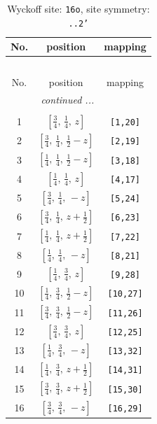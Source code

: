 \documentclass[fleqn,8pt]{jsarticle}
\begin{document}
\renewcommand{\arraystretch}{1.2}
\begin{longtable}{ccc}
\caption{Wyckoff site: {\tt 16o}, site symmetry: {\tt ..2'}}
 \\
 \hline \hline
No. & position & mapping \\ \hline \endfirsthead

\multicolumn{2}{l}{\tablename\ \thetable{}} \\
 \hline \hline
No. & position & mapping \\ \hline \endhead

 \hline \hline
\multicolumn{2}{r}{\footnotesize\it continued ...} \\ \endfoot

 \hline \hline
\multicolumn{2}{r}{} \\ \endlastfoot

1 & $\left[ \frac{3}{4},\, \frac{1}{4},\, z \right]$ & {\tt [1,20]} \\ \hline
2 & $\left[ \frac{3}{4},\, \frac{1}{4},\, \frac{1}{2} - z \right]$ & {\tt [2,19]} \\ \hline
3 & $\left[ \frac{1}{4},\, \frac{1}{4},\, \frac{1}{2} - z \right]$ & {\tt [3,18]} \\ \hline
4 & $\left[ \frac{1}{4},\, \frac{1}{4},\, z \right]$ & {\tt [4,17]} \\ \hline
5 & $\left[ \frac{3}{4},\, \frac{1}{4},\, - z \right]$ & {\tt [5,24]} \\ \hline
6 & $\left[ \frac{3}{4},\, \frac{1}{4},\, z + \frac{1}{2} \right]$ & {\tt [6,23]} \\ \hline
7 & $\left[ \frac{1}{4},\, \frac{1}{4},\, z + \frac{1}{2} \right]$ & {\tt [7,22]} \\ \hline
8 & $\left[ \frac{1}{4},\, \frac{1}{4},\, - z \right]$ & {\tt [8,21]} \\ \hline
9 & $\left[ \frac{1}{4},\, \frac{3}{4},\, z \right]$ & {\tt [9,28]} \\ \hline
10 & $\left[ \frac{1}{4},\, \frac{3}{4},\, \frac{1}{2} - z \right]$ & {\tt [10,27]} \\ \hline
11 & $\left[ \frac{3}{4},\, \frac{3}{4},\, \frac{1}{2} - z \right]$ & {\tt [11,26]} \\ \hline
12 & $\left[ \frac{3}{4},\, \frac{3}{4},\, z \right]$ & {\tt [12,25]} \\ \hline
13 & $\left[ \frac{1}{4},\, \frac{3}{4},\, - z \right]$ & {\tt [13,32]} \\ \hline
14 & $\left[ \frac{1}{4},\, \frac{3}{4},\, z + \frac{1}{2} \right]$ & {\tt [14,31]} \\ \hline
15 & $\left[ \frac{3}{4},\, \frac{3}{4},\, z + \frac{1}{2} \right]$ & {\tt [15,30]} \\ \hline
16 & $\left[ \frac{3}{4},\, \frac{3}{4},\, - z \right]$ & {\tt [16,29]} \\
\end{longtable}
\end{document}
